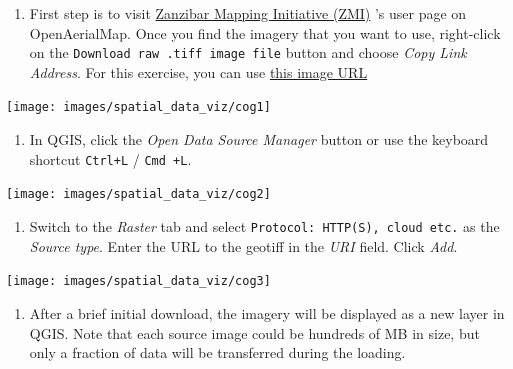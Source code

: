 \documentclass[
  12pt,
  a4paper]{article}
\providecommand{\tightlist}{%
  \setlength{\itemsep}{0pt}\setlength{\parskip}{0pt}}
\begin{document}
\begin{enumerate}
\def\labelenumi{\arabic{enumi}.}
\tightlist
\item
  First step is to visit
  \href{https://map.openaerialmap.org/\#/39.220848083496094,-6.162059582511514,11/user/5ac4842b26964b0010033104}{Zanzibar
  Mapping Initiative (ZMI)} 's user page on OpenAerialMap. Once you find
  the imagery that you want to use, right-click on the
  \texttt{Download\ raw\ .tiff\ image\ file} button and choose
  \emph{Copy Link Address}. For this exercise, you can use
  \href{https://oin-hotosm.s3.amazonaws.com/5b00370f2b6a08001185f125/10/5b00370f2b6a08001185f130.tif}{this
  image URL}
\end{enumerate}

\begin{center}\texttt{[image: images/spatial\_data\_viz/cog1]} \end{center}

\begin{enumerate}
\def\labelenumi{\arabic{enumi}.}
\setcounter{enumi}{1}
\tightlist
\item
  In QGIS, click the \emph{Open Data Source Manager} button or use the
  keyboard shortcut \texttt{Ctrl+L} / \texttt{Cmd\ +L}.
\end{enumerate}

\begin{center}\texttt{[image: images/spatial\_data\_viz/cog2]} \end{center}

\begin{enumerate}
\def\labelenumi{\arabic{enumi}.}
\setcounter{enumi}{2}
\tightlist
\item
  Switch to the \emph{Raster} tab and select
  \texttt{Protocol:\ HTTP(S),\ cloud\ etc.} as the \emph{Source type}.
  Enter the URL to the geotiff in the \emph{URI} field. Click
  \emph{Add}.
\end{enumerate}

\begin{center}\texttt{[image: images/spatial\_data\_viz/cog3]} \end{center}

\begin{enumerate}
\def\labelenumi{\arabic{enumi}.}
\setcounter{enumi}{3}
\tightlist
\item
  After a brief initial download, the imagery will be displayed as a new
  layer in QGIS. Note that each source image could be hundreds of MB in
  size, but only a fraction of data will be transferred during the
  loading.
\end{enumerate}
\end{document}
